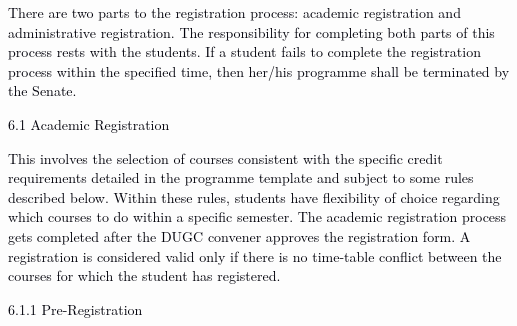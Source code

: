 \documentclass[12pt]{article}
\begin{document}
\vspace{\baselineskip}
\begin{justify}
{\fontsize{10pt}{12.0pt}\selectfont \textcolor[HTML]{00000A}{There are two parts to the registration process: academic registration and administrative registration. The responsibility for completing both parts of this process rests with the students. If a student fails to complete the registration process within the specified time, then her/his programme shall be terminated by the Senate.}\par}
\end{justify}\par


\vspace{\baselineskip}
\textcolor[HTML]{00000A}{6.1 Academic Registration}\par


\vspace{\baselineskip}
\begin{justify}
{\fontsize{10pt}{12.0pt}\selectfont \textcolor[HTML]{00000A}{This involves the selection of courses consistent with the specific credit requirements detailed in the programme template and subject to some rules described below. Within these rules, students have flexibility of choice regarding which courses to do within a specific semester. The academic registration process gets completed after the DUGC convener approves the registration form. A registration is considered valid only if there is no time-table conflict between the courses for which the student has registered.}\par}
\end{justify}\par


\vspace{\baselineskip}
{\fontsize{10pt}{12.0pt}\selectfont \textcolor[HTML]{00000A}{6.1.1 Pre-Registration}\par}\par
\end{document}
